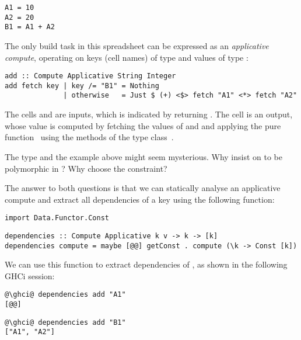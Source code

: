 \vspace{1mm}
\begin{verbatim}
A1 = 10
A2 = 20
B1 = A1 + A2
\end{verbatim}
\vspace{1mm}

\noindent
The only build task in this spreadsheet can be expressed as an \emph{applicative
compute}, operating on keys (cell names) of type  and values of
type :

\vspace{1mm}
\begin{verbatim}
add :: Compute Applicative String Integer
add fetch key | key /= "B1" = Nothing
              | otherwise   = Just $ (+) <$> fetch "A1" <*> fetch "A2"
\end{verbatim}
\vspace{1mm}

\noindent
The cells  and  are inputs, which is indicated by returning
. The cell  is an output, whose value is computed by
fetching the values of  and  and applying the pure
function~\hs{(+)} using the methods of the  type
class~\cite{mcbride2008applicative}.

The  type and the example above might seem mysterious. Why insist on
 to be polymorphic in ? Why choose the 
constraint?

The answer to both questions is that we can statically analyse an applicative
compute and extract all dependencies of a key using the following function:

\vspace{1mm}
\begin{verbatim}
import Data.Functor.Const
\end{verbatim}
\vspace{0.5mm}
\begin{verbatim}
dependencies :: Compute Applicative k v -> k -> [k]
dependencies compute = maybe [@@] getConst . compute (\k -> Const [k])
\end{verbatim}
\vspace{1mm}

\noindent
We can use this function to extract dependencies of , as shown in the
following GHCi session:

\vspace{1mm}
\begin{verbatim}
@\ghci@ dependencies add "A1"
[@@]
\end{verbatim}
\begin{verbatim}
@\ghci@ dependencies add "B1"
["A1", "A2"]
\end{verbatim}
\vspace{1mm}

